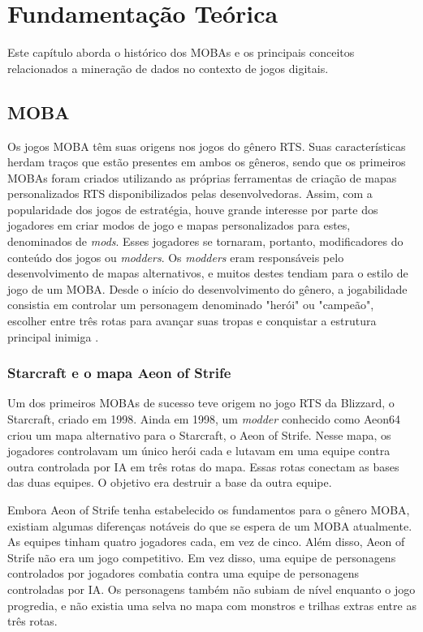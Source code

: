 \chapter{Fundamentação Teórica}

Este capítulo aborda o histórico dos MOBAs e os principais conceitos relacionados a mineração de dados no contexto de jogos digitais.

\section{MOBA}
Os jogos MOBA têm suas origens nos jogos do gênero RTS. Suas características herdam traços que estão presentes em ambos os gêneros, sendo que os primeiros MOBAs foram criados utilizando as próprias ferramentas de criação de mapas personalizados RTS disponibilizados pelas desenvolvedoras. Assim, com a popularidade dos jogos de estratégia, houve grande interesse por parte dos jogadores em criar modos de jogo e mapas personalizados para estes, denominados de \textit{mods}. Esses jogadores se tornaram, portanto, modificadores do conteúdo dos jogos ou \textit{modders}. Os \textit{modders} eram responsáveis pelo desenvolvimento de mapas alternativos, e muitos destes tendiam para o estilo de jogo de um MOBA. Desde o início do desenvolvimento do gênero, a jogabilidade consistia em controlar um personagem denominado "herói" ou "campeão", escolher entre três rotas para avançar suas tropas e conquistar a estrutura principal inimiga \cite{do2016desenvolvimento} \cite{ferrari2013generative} \cite{minotti2014history}.

\subsection{Starcraft e o mapa Aeon of Strife}
Um dos primeiros MOBAs de sucesso teve origem no jogo RTS da Blizzard, o Starcraft, criado em 1998. Ainda em 1998, um \textit{modder} conhecido como Aeon64 criou um mapa alternativo para o Starcraft, o Aeon of Strife. Nesse mapa, os jogadores controlavam um único herói cada e lutavam em uma equipe contra outra controlada por IA em três rotas do mapa. Essas rotas conectam as bases das duas equipes. O objetivo era destruir a base da outra equipe.

Embora Aeon of Strife tenha estabelecido os fundamentos para o gênero MOBA, existiam algumas diferenças notáveis do que se espera de um MOBA atualmente. As equipes tinham quatro jogadores cada, em vez de cinco. Além disso, Aeon of Strife não era um jogo competitivo. Em vez disso, uma equipe de personagens controlados por jogadores combatia contra uma equipe de personagens controladas por IA. Os personagens também não subiam de nível enquanto o jogo progredia, e não existia uma selva no mapa com monstros e trilhas extras entre as três rotas.

